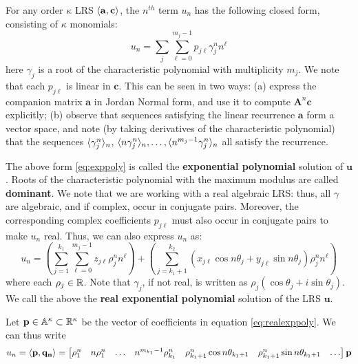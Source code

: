 For any order $\kappa$ LRS $\langle\mathbf{a}, \mathbf{c}\rangle$, the $n^{th}$ term $u_n$ has the following closed form, consisting of $\kappa$ monomials:
\begin{equation}
\label{eq:exppoly}
u_n = \sum_{j}\sum_{\ell=0}^{m_j - 1}p_{j\ell}\gamma_j^n n^\ell
\end{equation}
here $\gamma_j$ is a root of the characteristic polynomial with multiplicity $m_j$. We note that each $p_{j\ell}$ is linear in $\mathbf{c}$. This can be seen in two ways: (a) express the companion matrix $\mathbf{a}$ in Jordan Normal form, and use it to compute $\mathbf{A}^n\mathbf{c}$ explicitly; (b) observe that sequences satisfying the linear recurrence $\mathbf{a}$ form a vector space, and note (by taking derivatives of the characteristic polynomial) that the sequences $\langle\gamma_j^n\rangle_n$, $\langle n\gamma_j^n\rangle_n, \dots, \langle n^{m_j-1}\gamma_j^n\rangle_n$ all satisfy the recurrence. 

The above form \ref{eq:exppoly} is called the \textbf{exponential polynomial} solution of $\mathbf{u}$. Roots of the characteristic polynomial with the maximum modulus are called \textbf{dominant}. We note that we are working with a real algebraic LRS: thus, all $\gamma$ are algebraic, and if complex, occur in conjugate pairs. Moreover, the corresponding complex coefficients $p_{j\ell}$ must also occur in conjugate pairs to make $u_n$ real. Thus, we can also express $u_n$ as:
\begin{equation}
\label{eq:realexppoly}
u_n = \left(\sum_{j=1}^{k_1}\sum_{\ell = 0}^{m_j-1} z_{j\ell}\rho_j^n n^\ell\right) + \left(\sum_{j=k_1 + 1}^{k_2}  (x_{j\ell} \cos n\theta_j + y_{j\ell}\sin n\theta_j)\rho_j^n n^\ell\right)
\end{equation}
where each $\rho_j \in \mathbb{R}$. Note that $\gamma_j$, if not real, is written as $\rho_j(\cos \theta_j + i\sin \theta_j)$. We call the above the \textbf{real exponential polynomial} solution of the LRS $\mathbf{u}$. 

Let $\mathbf{p} \in \mathbb{A}^{\kappa} \subset \mathbb{R}^\kappa$ be the vector of coefficients in equation \ref{eq:realexppoly}. We can thus write
\begin{equation}
\label{eq:innerprod}
u_n = \langle\mathbf{p}, \mathbf{q_n}\rangle= 
\begin{bmatrix}
\rho_1^n & n \rho_1^n & \dots & n^{m_{k_1}-1}\rho_{k_1}^n & \rho_{k_1+1}^n\cos n\theta_{k_1+1} & \rho_{k_1+1}^n\sin n\theta_{k_1+1} & \dots
\end{bmatrix}\mathbf{p}
\end{equation}

